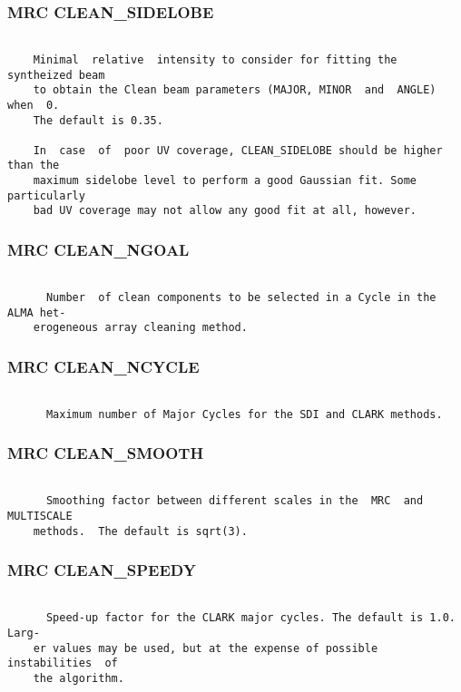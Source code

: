 \subsubsection{MRC CLEAN\_SIDELOBE}
\begin{verbatim}

    Minimal  relative  intensity to consider for fitting the syntheized beam
    to obtain the Clean beam parameters (MAJOR, MINOR  and  ANGLE)  when  0.
    The default is 0.35.

    In  case  of  poor UV coverage, CLEAN_SIDELOBE should be higher than the
    maximum sidelobe level to perform a good Gaussian fit. Some particularly
    bad UV coverage may not allow any good fit at all, however.

\end{verbatim}
\subsubsection{MRC CLEAN\_NGOAL}
\begin{verbatim}

      Number  of clean components to be selected in a Cycle in the ALMA het-
    erogeneous array cleaning method.

\end{verbatim}
\subsubsection{MRC CLEAN\_NCYCLE}
\begin{verbatim}

      Maximum number of Major Cycles for the SDI and CLARK methods.

\end{verbatim}
\subsubsection{MRC CLEAN\_SMOOTH}
\begin{verbatim}

      Smoothing factor between different scales in the  MRC  and  MULTISCALE
    methods.  The default is sqrt(3).

\end{verbatim}
\subsubsection{MRC CLEAN\_SPEEDY}
\begin{verbatim}

      Speed-up factor for the CLARK major cycles. The default is 1.0.  Larg-
    er values may be used, but at the expense of possible  instabilities  of
    the algorithm.

\end{verbatim}
